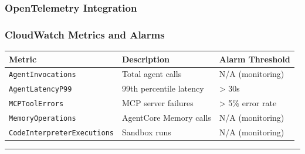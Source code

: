 \subsubsection{OpenTelemetry
Integration}\label{opentelemetry-integration}

\begin{Shaded}
\begin{Highlighting}[]

\OperatorTok{=}\NormalTok{,}
\OperatorTok{=}\NormalTok{,  }
\NormalTok{)}

\OperatorTok{=}\OperatorTok{=}\NormalTok{)}
\end{Highlighting}
\end{Shaded}

\subsubsection{CloudWatch Metrics and
Alarms}\label{cloudwatch-metrics-and-alarms}

{\def\LTcaptype{none} %
\begin{longtable}[]{@{}lll@{}}
\toprule\noalign{}
Metric & Description & Alarm Threshold \\
\midrule\noalign{}
\endhead
\bottomrule\noalign{}
\endlastfoot
\texttt{AgentInvocations} & Total agent calls & N/A (monitoring) \\
\texttt{AgentLatencyP99} & 99th percentile latency & \textgreater{}
30s \\
\texttt{MCPToolErrors} & MCP server failures & \textgreater{} 5\% error
rate \\
\texttt{MemoryOperations} & AgentCore Memory calls & N/A (monitoring) \\
\texttt{CodeInterpreterExecutions} & Sandbox runs & N/A (monitoring) \\
\end{longtable}
}

\begin{center}\rule{0.5\linewidth}{0.5pt}\end{center}

